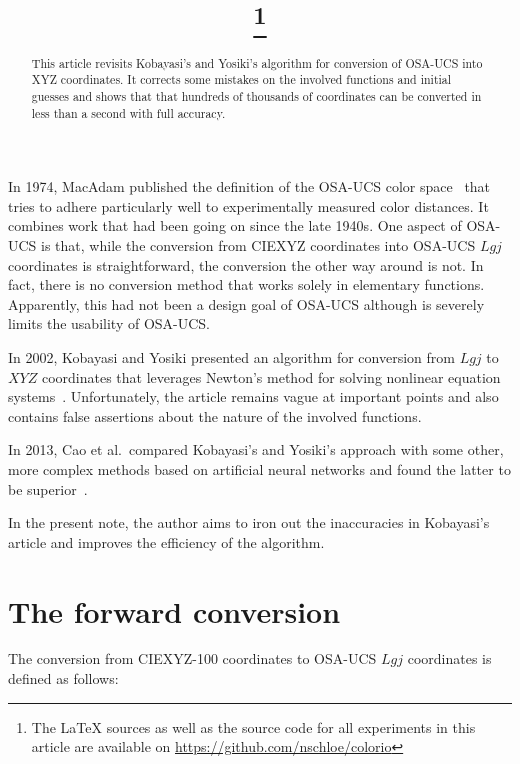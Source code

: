 \documentclass{scrartcl}
\title{\mytitle\footnote{The LaTeX sources as well as the source code for all
experiments in this article are available on \url{https://github.com/nschloe/colorio}}}
\author{\myauthor}
\theoremstyle{named}
\begin{document}
\maketitle

\begin{abstract}
This article revisits Kobayasi's and Yosiki's algorithm for conversion of
  OSA-UCS into XYZ coordinates. It corrects some mistakes on the involved
  functions and initial guesses and shows that that hundreds of thousands of
  coordinates can be converted in less than a second with full accuracy.
\end{abstract}

In 1974, MacAdam published the definition of the OSA-UCS color space~\cite{macadam} that
tries to adhere particularly well to experimentally measured color distances. It
combines work that had been going on since the late 1940s. One aspect of OSA-UCS is
that, while the conversion from CIEXYZ coordinates into OSA-UCS $Lgj$ coordinates is
straightforward, the conversion the other way around is not. In fact, there is no
conversion method that works solely in elementary functions. Apparently, this had not
been a design goal of OSA-UCS although is severely limits the usability of OSA-UCS.

In 2002, Kobayasi and Yosiki presented an algorithm for conversion from $Lgj$ to $XYZ$
coordinates that leverages Newton's method for solving nonlinear equation
systems~\cite{kobayasi}. Unfortunately, the article remains vague at important points
and also contains false assertions about the nature of the involved functions.

In 2013, Cao et al.\ compared Kobayasi's and Yosiki's approach with some other, more
complex methods based on artificial neural networks and found the latter to be
superior~\cite{cao}.

In the present note, the author aims to iron out the inaccuracies in Kobayasi's article
and improves the efficiency of the algorithm.

\section{The forward conversion}

The conversion from CIEXYZ-100 coordinates to OSA-UCS $Lgj$ coordinates is defined as
follows:
\end{document}
